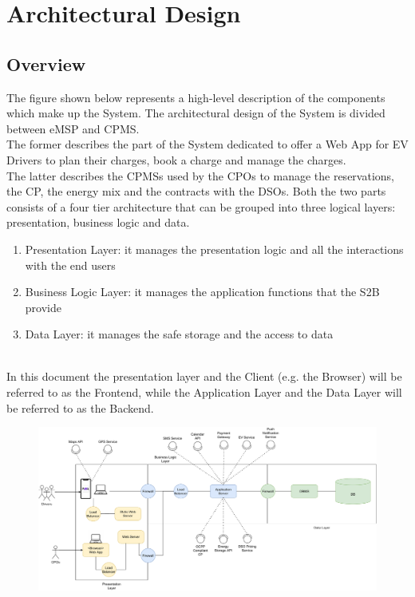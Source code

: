 \section{Architectural Design}
\subsection{Overview}
The figure shown below represents a high-level description of the components which make up the System.
The architectural design of the System is divided between eMSP and CPMS. \\
The former describes the part of the System dedicated to offer a Web App for
EV Drivers to plan their charges, book a charge and manage the charges. \\
The latter describes the CPMSs used by the CPOs to manage the reservations, the CP, the energy mix and the contracts with the DSOs.
Both the two parts consists of a four tier architecture that can be grouped into three logical layers: presentation, business logic and data.
\begin {enumerate}
\item Presentation Layer: it manages the presentation logic and all the interactions with the end users
\item Business Logic Layer: it manages the application functions that the S2B provide
\item Data Layer: it manages the safe storage and the access to data
\end{enumerate}
\hfill \\
In this document the presentation layer and the Client (e.g. the Browser)
will be referred to as the Frontend, while the Application Layer and the Data Layer
will be referred to as the Backend.

\begin{figure}[H]
    \centering
    \includegraphics[scale=0.42]{src/Overview/overview_diagram.pdf}
\end{figure}

